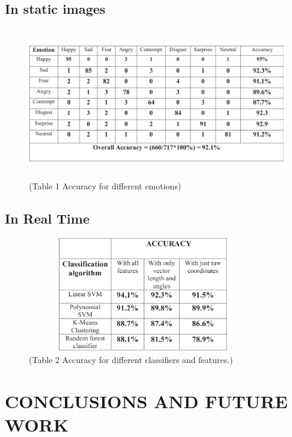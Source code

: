 \documentclass[a4paper,12pt,oneside]{article}
\begin{document}
\subsection{In static images}
\paragraph{}

\begin{figure}[H]
\centering
\includegraphics[height=6.5cm,width=12cm]{new1.jpg}
\caption{(Table 1 Accuracy for different emotions)}
\end{figure}

\subsection{In Real Time}

\begin{figure}[H]
\centering
\includegraphics[height=5cm,width=10cm]{new2.jpg}
\caption{(Table 2 Accuracy for different classifiers and features.)}
\end{figure}


\newpage
\section{CONCLUSIONS AND FUTURE WORK}
\end{document}
